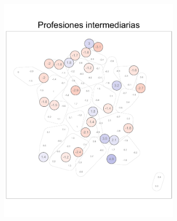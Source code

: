 \begin{figure}
\begin{subfigure}{0.235\textwidth}
	\includegraphics[width = \textwidth]{Figs/Efectos/Dorling_Efectos_CSP4_Modelo_H}
	\end{subfigure}
	~
	\begin{subfigure}{0.235\textwidth}

\end{subfigure}
\end{figure}
